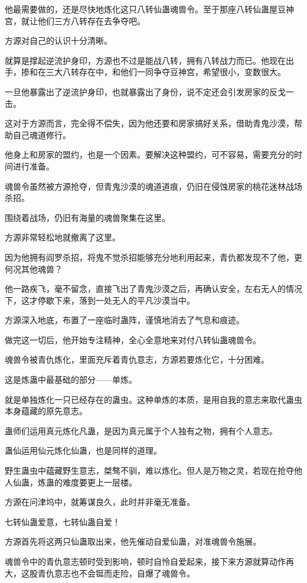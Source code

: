 \begin{this_body}
他最需要做的，还是尽快地炼化这只八转仙蛊魂兽令。至于那座八转仙蛊屋豆神宫，就让他们三方八转存在去争夺吧。

方源对自己的认识十分清晰。

就算是撑起逆流护身印，方源也不过是能战八转，拥有八转战力而已。他现在出手，掺和在三大八转存在中，和他们一同争夺豆神宫，希望很小，变数很大。

一旦他暴露出了逆流护身印，也就暴露出了身份，说不定还会引发房家的反戈一击。

这对于方源而言，完全得不偿失，因为他还要和房家搞好关系，借助青鬼沙漠，帮助自己魂道修行。

他身上和房家的盟约，也是一个因素。要解决这种盟约，可不容易，需要充分的时间进行准备。

魂兽令虽然被方源抢夺，但青鬼沙漠的魂道道痕，仍旧在侵蚀房家的桃花迷林战场杀招。

围绕着战场，仍旧有海量的魂兽聚集在这里。

方源非常轻松地就撤离了这里。

因为他拥有阎罗杀招，将鬼不觉杀招能够充分地利用起来，青仇都发现不了他，更何况其他魂兽？

他一路疾飞，毫不留念，直接飞出了青鬼沙漠之后，再确认安全，左右无人的情况下，这才停歇下来，落到一处无人的平凡沙漠当中。

方源深入地底，布置了一座临时蛊阵，谨慎地消去了气息和痕迹。

做完这一切后，他开始专注精神，全心全意地来对付八转仙蛊魂兽令。

魂兽令被青仇炼化，里面充斥着青仇意志，方源若要炼化它，十分困难。

这是炼蛊中最基础的部分——单炼。

就是单独炼化一只已经存在的蛊虫。这种单炼的本质，是用自我的意志来取代蛊虫本身蕴藏的原先意志。

蛊师们运用真元炼化凡蛊，是因为真元属于个人独有之物，拥有个人意志。

蛊仙运用仙元炼化仙蛊，也是同样的道理。

野生蛊虫中蕴藏野生意志，桀骜不驯，难以炼化。但人是万物之灵，若现在抢夺他人仙蛊，炼蛊的难度要更上一层楼。

方源在问津坞中，就筹谋良久，此时并非毫无准备。

七转仙蛊爱意，七转仙蛊自爱！

方源首先将这两只仙蛊取出来，他先催动自爱仙蛊，对准魂兽令施展。

魂兽令中的青仇意志顿时受到影响，顿时自怜自爱起来，接下来方源就算动作再大，这股青仇意志也不会铤而走险，自爆了魂兽令。


\end{this_body}
